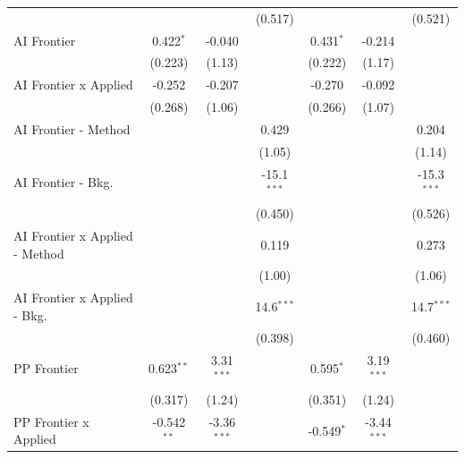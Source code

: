 \begin{tabular}{lcccccc}
                                  &                &               & (0.517)       &                &               & (0.521)\\   
   AI Frontier                    & 0.422$^{*}$    & -0.040        &               & 0.431$^{*}$    & -0.214        &   \\   
                                  & (0.223)        & (1.13)        &               & (0.222)        & (1.17)        &   \\   
   AI Frontier x Applied          & -0.252         & -0.207        &               & -0.270         & -0.092        &   \\   
                                  & (0.268)        & (1.06)        &               & (0.266)        & (1.07)        &   \\   
   AI Frontier - Method           &                &               & 0.429         &                &               & 0.204\\   
                                  &                &               & (1.05)        &                &               & (1.14)\\   
   AI Frontier - Bkg.             &                &               & -15.1$^{***}$ &                &               & -15.3$^{***}$\\   
                                  &                &               & (0.450)       &                &               & (0.526)\\   
   AI Frontier x Applied - Method &                &               & 0.119         &                &               & 0.273\\   
                                  &                &               & (1.00)        &                &               & (1.06)\\   
   AI Frontier x Applied - Bkg.   &                &               & 14.6$^{***}$  &                &               & 14.7$^{***}$\\   
                                  &                &               & (0.398)       &                &               & (0.460)\\   
   PP Frontier                    & 0.623$^{**}$   & 3.31$^{***}$  &               & 0.595$^{*}$    & 3.19$^{***}$  &   \\   
                                  & (0.317)        & (1.24)        &               & (0.351)        & (1.24)        &   \\   
   PP Frontier x Applied          & -0.542$^{**}$  & -3.36$^{***}$ &               & -0.549$^{*}$   & -3.44$^{***}$ &   \\   

\end{tabular}
